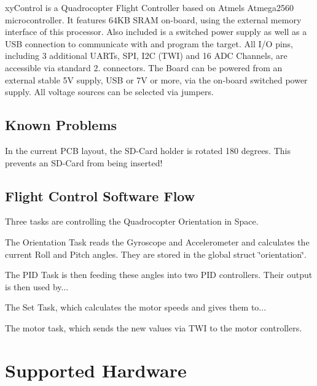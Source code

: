 

xy\-Control is a Quadrocopter Flight Controller based on Atmels Atmega2560 microcontroller. It features 64\-K\-B S\-R\-A\-M on-\/board, using the external memory interface of this processor. Also included is a switched power supply as well as a U\-S\-B connection to communicate with and program the target. All I/\-O pins, including 3 additional U\-A\-R\-Ts, S\-P\-I, I2\-C (T\-W\-I) and 16 A\-D\-C Channels, are accessible via standard 2.\-54mm connectors. The Board can be powered from an external stable 5\-V supply, U\-S\-B or 7\-V or more, via the on-\/board switched power supply. All voltage sources can be selected via jumpers.

\subsection*{Known Problems}

In the current P\-C\-B layout, the S\-D-\/\-Card holder is rotated 180 degrees. This prevents an S\-D-\/\-Card from being inserted!

\subsection*{Flight Control Software Flow}

Three tasks are controlling the Quadrocopter Orientation in Space.


\begin{DoxyItemize}
\item The Orientation Task reads the Gyroscope and Accelerometer and calculates the current Roll and Pitch angles. They are stored in the global struct \char`\"{}orientation\char`\"{}.
\item The P\-I\-D Task is then feeding these angles into two P\-I\-D controllers. Their output is then used by...
\item The Set Task, which calculates the motor speeds and gives them to...
\item The motor task, which sends the new values via T\-W\-I to the motor controllers.
\end{DoxyItemize}

\section*{Supported Hardware}


